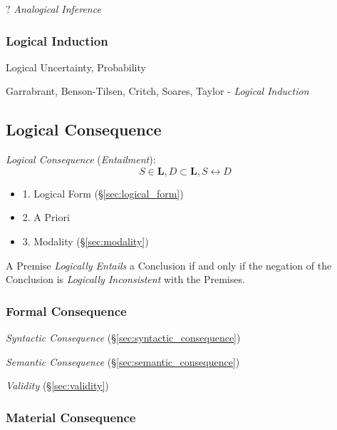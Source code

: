 ? \emph{Analogical Inference}



\subsubsection{Logical Induction}\label{sec:logical_induction}

Logical Uncertainty, Probability

Garrabrant, Benson-Tilsen, Critch, Soares, Taylor - \emph{Logical
  Induction} %



\subsection{Logical Consequence}\label{sec:logical_consequence}
\cite{beall-restall05}

\emph{Logical Consequence} (\emph{Entailment}):
\[
  S \in \mathbf{L}, D \subset \mathbf{L}, S \leftrightarrow D
\]
\begin{itemize}
  \item 1. Logical Form (\S\ref{sec:logical_form})
  \item 2. A Priori
  \item 3. Modality (\S\ref{sec:modality})
\end{itemize}

A Premise \emph{Logically Entails} a Conclusion if and only if the
negation of the Conclusion is \emph{Logically Inconsistent} with the
Premises.



\subsubsection{Formal Consequence}\label{sec:formal_consequence}

\emph{Syntactic Consequence} (\S\ref{sec:syntactic_consequence})

\emph{Semantic Consequence} (\S\ref{sec:semantic_consequence})

\emph{Validity} (\S\ref{sec:validity})



\subsubsection{Material Consequence}

